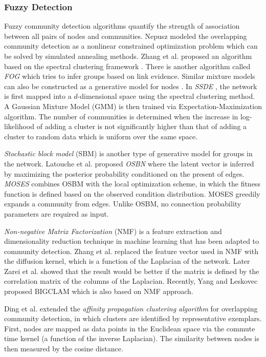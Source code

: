 \subsubsection*{Fuzzy Detection}
Fuzzy community detection algorithms quantify the strength of association between all pairs of nodes and communities.  Nepusz
\cite{nepusz07b} modeled the
overlapping community detection as a nonlinear constrained optimization problem which can be solved by simulated annealing methods. Zhang
et al. \cite{Zhang2007483} proposed an algorithm based on the spectral clustering framework \cite{PhysRevE.74.036104}. There is another
algorithm called {\em FOG}  \cite{5473438} which tries to infer groups based on link evidence. Similar mixture models can also be
constructed as a generative model for nodes \cite{4781180}. In {\em SSDE} \cite{Magdon-IsmailP11}, the network is first mapped into a
$d$-dimensional space using the spectral clustering method. A Gaussian Mixture Model (GMM) is then trained via Expectation-Maximization
algorithm. The number of communities is determined when the increase in log-likelihood of adding a cluster is not significantly higher than
that of adding a cluster to random data which is uniform over the same space.

{\em Stochastic block model} (SBM) \cite{Nowicki55} is another type of generative model for groups in the network. Latouche et al.
\cite{1220.62083} proposed {\em OSBN} where the latent vector is inferred by maximizing the posterior probability conditioned on the present
of edges. {\em MOSES} \cite{McDaid:2010} combines OSBM with the local optimization scheme, in which the fitness function is defined based
on the observed condition distribution. MOSES greedily expands a community from edges. Unlike OSBM, no connection probability parameters are
required as input. 

\fi

{\em Non-negative Matrix Factorization} (NMF) is a feature extraction and dimensionality reduction technique in machine learning that has
been adapted to community detection. Zhang et al. \cite{Zhang046103} replaced the feature vector used in NMF with the diffusion kernel,
which is a function of the Laplacian of the network. Later Zarei et al. \cite{ZareiP11013} showed that the result would be better if the
matrix is defined by the  correlation matrix of the columns of the Laplacian. Recently, Yang and Leskovec \cite{lesco} proposed BIGCLAM
which is also based on
NMF approach.

Ding et al. \cite{5473438} extended the {\em affinity propagation clustering algorithm} \cite{Frey07} for overlapping community detection,
in which
clusters are identified by representative exemplars. First, nodes are mapped as data points in the Euclidean space via the commute time
kernel (a function of the inverse Laplacian). The similarity between nodes is then measured by the cosine distance.


